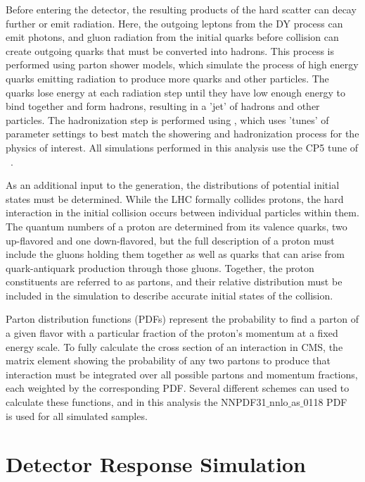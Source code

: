 Before entering the detector, the resulting products of the hard scatter can decay further or emit radiation.
Here, the outgoing leptons from the DY process can emit photons, and gluon radiation from the initial quarks before collision can create outgoing quarks that must be converted into hadrons. 
This process is performed using parton shower models, which simulate the process of high energy quarks emitting radiation to produce more quarks and other particles.
The quarks lose energy at each radiation step until they have low enough energy to bind together and form hadrons, resulting in a 'jet' of hadrons and other particles.
The hadronization step is performed using \pythia, which uses 'tunes' of parameter settings to best match the showering and hadronization process for the physics of interest. 
All simulations performed in this analysis use the CP5 tune of \pythia~\cite{pythia_tune}. 

As an additional input to the generation, the distributions of potential initial states must be determined.
While the LHC formally collides protons, the hard interaction in the initial collision occurs between individual particles within them.
The quantum numbers of a proton are determined from its valence quarks, two up-flavored and one down-flavored, but the full description of a proton must include the gluons holding them together as well as quarks that can arise from quark-antiquark production through those gluons. 
Together, the proton constituents are referred to as partons, and their relative distribution must be included in the simulation to describe accurate initial states of the collision.

Parton distribution functions (PDFs) represent the probability to find a parton of a given flavor with a particular fraction of the proton's momentum at a fixed energy scale.
To fully calculate the cross section of an interaction in CMS, the matrix element showing the probability of any two partons to produce that interaction must be integrated over all possible partons and momentum fractions, each weighted by the corresponding PDF. 
Several different schemes can used to calculate these functions, and in this analysis the NNPDF31$\_$nnlo$\_$as$\_$0118 PDF~\cite{nnpdf} is used for all simulated samples.

\section{Detector Response Simulation}

